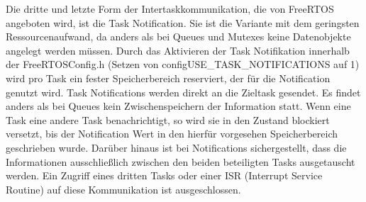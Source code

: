 Die dritte und letzte Form der Intertaskkommunikation, die von FreeRTOS angeboten wird, ist die Task Notification. Sie ist die Variante mit dem geringsten Ressourcenaufwand, da anders als bei Queues und Mutexes keine Datenobjekte angelegt werden müssen. Durch das Aktivieren der Task Notifikation innerhalb der FreeRTOSConfig.h (Setzen von configUSE\_TASK\_NOTIFICATIONS auf 1) wird pro Task ein fester Speicherbereich reserviert, der für die Notification genutzt wird. Task Notifications werden direkt an die Zieltask gesendet. Es findet anders als bei Queues kein Zwischenspeichern der Information statt. Wenn eine Task eine andere Task benachrichtigt, so wird sie in den Zustand blockiert versetzt, bis der Notification Wert in den hierfür vorgesehen Speicherbereich geschrieben wurde. Darüber hinaus ist bei Notifications sichergestellt, dass die Informationen ausschließlich zwischen den beiden beteiligten Tasks ausgetauscht werden. Ein Zugriff eines dritten Tasks oder einer ISR (Interrupt Service Routine) auf diese Kommunikation ist ausgeschlossen.
